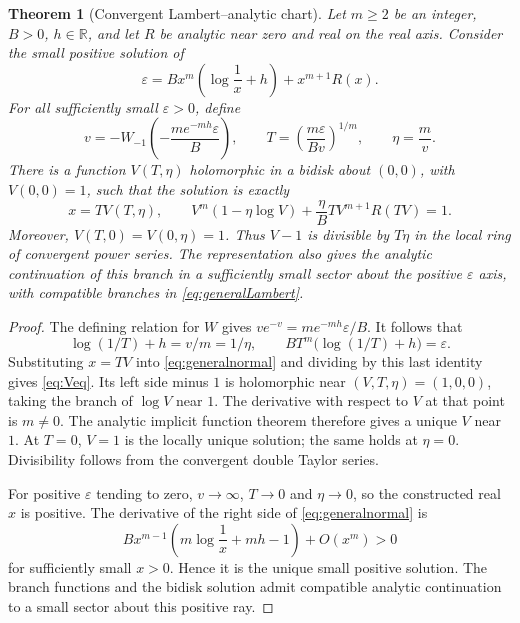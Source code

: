\documentclass[11pt,a4paper]{article}
\numberwithin{equation}{section}
\newtheorem{theorem}{Theorem}[section]
\theoremstyle{definition}
\theoremstyle{remark}
\newcommand{\R}{\mathbb R}
\newcommand{\eps}{\varepsilon}
\begin{document}
\begin{theorem}[Convergent Lambert--analytic chart]
\label{thm:lambert}
Let $m\ge2$ be an integer, $B>0$, $h\in\R$, and let $R$ be analytic near
zero and real on the real axis. Consider the small positive solution of
\begin{equation}\label{eq:generalnormal}
 \eps=Bx^m\left(\log\frac1x+h\right)+x^{m+1}R(x).
\end{equation}
For all sufficiently small $\eps>0$, define
\begin{equation}\label{eq:generalLambert}
 v=-W_{-1}\left(-\frac{m e^{-mh}\eps}{B}\right),\qquad
 T=\left(\frac{m\eps}{Bv}\right)^{1/m},\qquad \eta=\frac m v.
\end{equation}
There is a function $V(T,\eta)$ holomorphic in a bidisk about $(0,0)$,
with $V(0,0)=1$, such that the solution is exactly
\begin{equation}\label{eq:Veq}
 x=TV(T,\eta),\qquad
 V^m(1-\eta\log V)+\frac\eta B T V^{m+1}R(TV)=1.
\end{equation}
Moreover, $V(T,0)=V(0,\eta)=1$. Thus $V-1$ is divisible by $T\eta$ in
the local ring of convergent power series. The representation also gives
the analytic continuation of this branch in a sufficiently small sector
about the positive $\eps$ axis, with compatible branches in
\eqref{eq:generalLambert}.
\end{theorem}
\begin{proof}
The defining relation for $W$ gives
$v e^{-v}=m e^{-mh}\eps/B$. It follows that
\[
 \log(1/T)+h=v/m=1/\eta,\qquad
 BT^m\bigl(\log(1/T)+h\bigr)=\eps.
\]
Substituting $x=TV$ into \eqref{eq:generalnormal} and dividing by this
last identity gives \eqref{eq:Veq}. Its left side minus $1$ is holomorphic
near $(V,T,\eta)=(1,0,0)$, taking the branch of $\log V$ near $1$.
The derivative with respect to $V$ at that point is $m\ne0$. The analytic
implicit function theorem therefore gives a unique $V$ near $1$.
At $T=0$, $V=1$ is the locally unique solution; the same holds at
$\eta=0$. Divisibility follows from the convergent double Taylor series.

For positive $\eps$ tending to zero, $v\to\infty$, $T\to0$ and
$\eta\to0$, so the constructed real $x$ is positive. The derivative of
the right side of \eqref{eq:generalnormal} is
\[
 Bx^{m-1}\left(m\log\frac1x+mh-1\right)+O(x^m)>0
\]
for sufficiently small $x>0$. Hence it is the unique small positive
solution. The branch functions and the bidisk solution admit compatible
analytic continuation to a small sector about this positive ray.
\end{proof}
\end{document}
